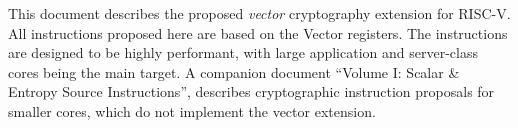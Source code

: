 
This document describes the proposed {\em vector} cryptography
extension for RISC-V.
All instructions proposed here are based on the Vector registers.
The instructions are designed to be highly performant, with large
application and server-class cores being the main target.
A companion document ``Volume I: Scalar \& Entropy Source Instructions'',
describes
cryptographic instruction proposals for smaller cores, which do not
implement the vector extension.
